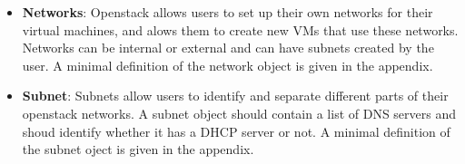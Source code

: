 \begin{itemize}
\item \textbf{Networks}: Openstack allows users to set up their own
networks for their virtual machines, and alows them to create new VMs that
use these networks. Networks can be internal or external and can have
subnets created by the user. A minimal definition of the network object
is given in the appendix.

\item \textbf{Subnet}: Subnets allow users to identify and separate
different parts of their openstack networks. A subnet object should contain
a list of DNS servers and shoud identify whether it has a DHCP server or not.
A minimal definition of the subnet oject is given in the appendix.
\end{itemize}







 
